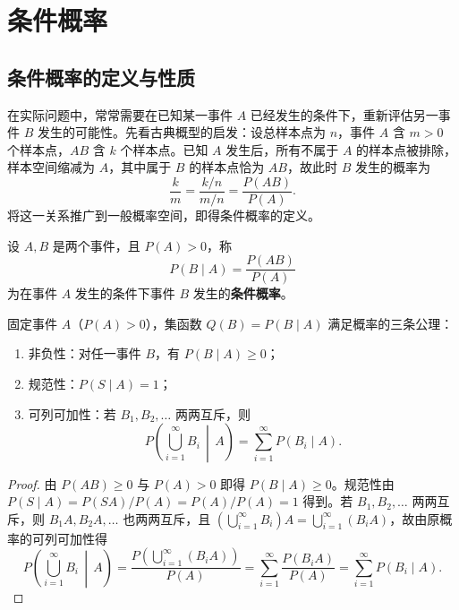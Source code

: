 \section{条件概率}
\label{sec:conditional-probability}

\subsection{条件概率的定义与性质}

在实际问题中，常常需要在已知某一事件 $A$ 已经发生的条件下，重新评估另一事件 $B$ 发生的可能性。先看古典概型的启发：设总样本点为 $n$，事件 $A$ 含 $m>0$ 个样本点，$AB$ 含 $k$ 个样本点。已知 $A$ 发生后，所有不属于 $A$ 的样本点被排除，样本空间缩减为 $A$，其中属于 $B$ 的样本点恰为 $AB$，故此时 $B$ 发生的概率为
\[
  \frac{k}{m}=\frac{k/n}{m/n}=\frac{P(AB)}{P(A)}.
\]
将这一关系推广到一般概率空间，即得条件概率的定义。

\begin{definition}[条件概率]
\label{def:conditional-probability}
设 $A,B$ 是两个事件，且 $P(A)>0$，称
\begin{equation}
  P(B\mid A)=\frac{P(AB)}{P(A)}
  \label{eq:conditional-probability}
\end{equation}
为在事件 $A$ 发生的条件下事件 $B$ 发生的\textbf{条件概率}。
\end{definition}

\begin{proposition}[条件概率满足概率公理]
\label{prop:conditional-axioms}
固定事件 $A$（$P(A)>0$），集函数 $Q(B)=P(B\mid A)$ 满足概率的三条公理：
\begin{enumerate}
  \item 非负性：对任一事件 $B$，有 $P(B\mid A)\ge 0$；
  \item 规范性：$P(S\mid A)=1$；
  \item 可列可加性：若 $B_1,B_2,\ldots$ 两两互斥，则
  \[
    P\left(\bigcup_{i=1}^{\infty}B_i\,\middle|\,A\right)=\sum_{i=1}^{\infty}P(B_i\mid A).
  \]
\end{enumerate}
\end{proposition}
\begin{proof}
由 $P(AB)\ge 0$ 与 $P(A)>0$ 即得 $P(B\mid A)\ge 0$。规范性由 $P(S\mid A)=P(SA)/P(A)=P(A)/P(A)=1$ 得到。若 $B_1,B_2,\ldots$ 两两互斥，则 $B_1A,B_2A,\ldots$ 也两两互斥，且 $\left(\bigcup_{i=1}^{\infty}B_i\right)A=\bigcup_{i=1}^{\infty}(B_iA)$，故由原概率的可列可加性得
\[
  P\left(\bigcup_{i=1}^{\infty}B_i\,\middle|\,A\right)
  =\frac{P\left(\bigcup_{i=1}^{\infty}(B_iA)\right)}{P(A)}
  =\sum_{i=1}^{\infty}\frac{P(B_iA)}{P(A)}
  =\sum_{i=1}^{\infty}P(B_i\mid A).
\]
\end{proof}

